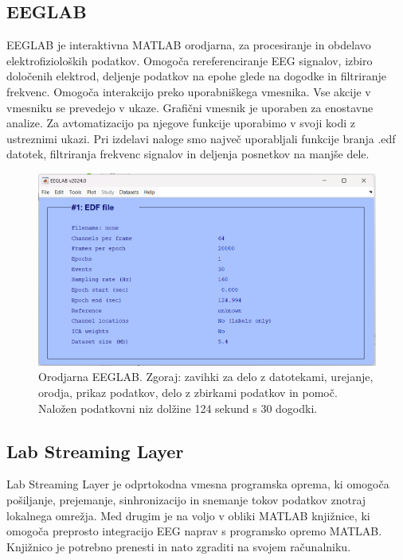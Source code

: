 \subsection{EEGLAB}
EEGLAB je interaktivna MATLAB orodjarna, za procesiranje in obdelavo elektrofizioloških podatkov. Omogoča rereferenciranje EEG signalov, izbiro določenih elektrod, deljenje podatkov na epohe glede na dogodke in filtriranje frekvenc. Omogoča interakcijo preko uporabniškega vmesnika. Vse akcije v vmesniku se prevedejo v ukaze. Grafični vmesnik je uporaben za enostavne analize. Za avtomatizacijo pa njegove funkcije uporabimo v svoji kodi z ustreznimi ukazi. Pri izdelavi naloge smo največ uporabljali funkcije branja .edf datotek, filtriranja frekvenc signalov in deljenja posnetkov na manjše dele. \cite{EEGLAB}
\begin{figure}[h!]
    \begin{center}
    \includegraphics[width=1\linewidth]{slike/EEGLAB.png}
    \end{center}
    \caption[Orodjarna EEGLAB.]{Orodjarna EEGLAB. Zgoraj: zavihki za delo z datotekami, urejanje, orodja, prikaz podatkov, delo z zbirkami podatkov in pomoč. Naložen podatkovni niz dolžine 124 sekund s 30 dogodki.}
    \end{figure}

\subsection{Lab Streaming Layer}
Lab Streaming Layer je odprtokodna vmesna programska oprema, ki omogoča pošiljanje, prejemanje, sinhronizacijo in snemanje tokov podatkov znotraj lokalnega omrežja. Med drugim je na voljo v obliki MATLAB knjižnice, ki omogoča preprosto integracijo EEG naprav s programsko opremo MATLAB. Knjižnico je potrebno prenesti in nato zgraditi na svojem računalniku.  \cite{Lslwebsite}

